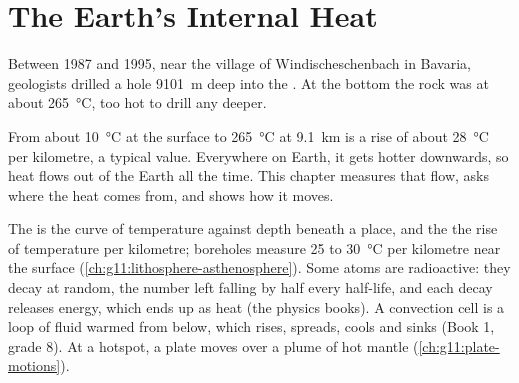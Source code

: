 \chapter{The Earth's Internal Heat}\label{ch:g12:internal-heat}

Between 1987 and 1995, near the village of Windischeschenbach in Bavaria,
geologists drilled a hole \qty{9101}{m} deep into the . At the
bottom the rock was at about \qty{265}{\celsius}, too hot to drill any
deeper.

From about \qty{10}{\celsius} at the surface to \qty{265}{\celsius} at
\qty{9.1}{km} is a rise of about \qty{28}{\celsius} per kilometre, a typical
value. Everywhere on Earth, it gets hotter downwards, so heat flows out of
the Earth all the time. This chapter measures that flow, asks where the heat
comes from, and shows how it moves.

\begin{recall}
The  is the curve of temperature against depth beneath a place, and
the  the rise of temperature per kilometre; boreholes
measure 25 to \qty{30}{\celsius} per kilometre near the surface
(\cref{ch:g11:lithosphere-asthenosphere}). Some atoms are radioactive: they
decay at random, the number left falling by half every half-life, and each
decay releases energy, which ends up as heat (the physics books). A
convection cell is a loop of fluid warmed from below, which rises, spreads,
cools and sinks (Book 1, grade 8). At a hotspot, a plate moves over a plume
of hot mantle (\cref{ch:g11:plate-motions}).
\end{recall}

